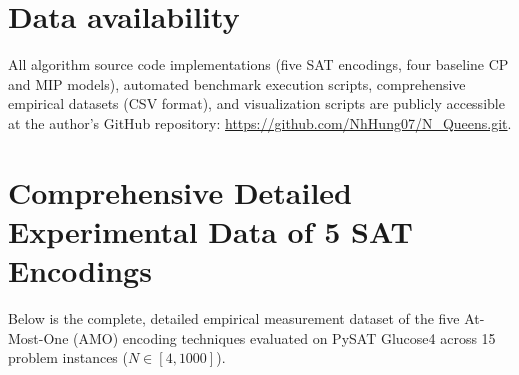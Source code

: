 \documentclass[a4paper,fleqn]{cas-sc}
\begin{document}
\section*{Data availability}
All algorithm source code implementations (five SAT encodings, four baseline CP and MIP models), automated benchmark execution scripts, comprehensive empirical datasets (CSV format), and visualization scripts are publicly accessible at the author's GitHub repository: \url{https://github.com/NhHung07/N_Queens.git}.

\appendix
\section{Comprehensive Detailed Experimental Data of 5 SAT Encodings}
\label{app:detailed_data}

Below is the complete, detailed empirical measurement dataset of the five At-Most-One (AMO) encoding techniques evaluated on PySAT Glucose4 across 15 problem instances ($N \in [4, 1000]$).
\end{document}
